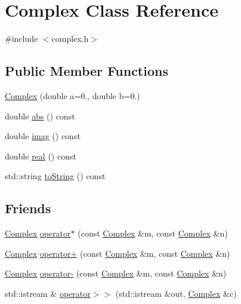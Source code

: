 \hypertarget{classComplex}{}\section{Complex Class Reference}
\label{classComplex}


{\ttfamily \#include $<$complex.\+h$>$}

\subsection*{Public Member Functions}
\begin{DoxyCompactItemize}
\item 
\mbox{\hyperlink{classComplex_a900a80f2ea5c0c3dc9393402b6ce8df3}{Complex}} (double a=0., double b=0.)
\item 
double \mbox{\hyperlink{classComplex_ad534b137e1216937005dd363a5579ed0}{abs}} () const
\item 
double \mbox{\hyperlink{classComplex_ac6d0f1ec6a24b5904bc3a206b3c117ff}{imag}} () const
\item 
double \mbox{\hyperlink{classComplex_a3a3f678878dde3a729f94dfefbdc4ef2}{real}} () const
\item 
std\+::string \mbox{\hyperlink{classComplex_a1fe5121d6528fdea3f243321b3fa3a49}{to\+String}} () const
\end{DoxyCompactItemize}
\subsection*{Friends}
\begin{DoxyCompactItemize}
\item 
\mbox{\hyperlink{classComplex}{Complex}} \mbox{\hyperlink{classComplex_afcef21e5f4570416aa39a3412fb107c4}{operator$\ast$}} (const \mbox{\hyperlink{classComplex}{Complex}} \&m, const \mbox{\hyperlink{classComplex}{Complex}} \&n)
\item 
\mbox{\hyperlink{classComplex}{Complex}} \mbox{\hyperlink{classComplex_a47f36e8ddc742de052086d653d7b8e04}{operator+}} (const \mbox{\hyperlink{classComplex}{Complex}} \&m, const \mbox{\hyperlink{classComplex}{Complex}} \&n)
\item 
\mbox{\hyperlink{classComplex}{Complex}} \mbox{\hyperlink{classComplex_ab2328f9c33b801e1ab56ee119493440f}{operator-\/}} (const \mbox{\hyperlink{classComplex}{Complex}} \&m, const \mbox{\hyperlink{classComplex}{Complex}} \&n)
\item 
std\+::istream \& \mbox{\hyperlink{classComplex_a4c3792c8f6bd0778d0607c3a161e9eb6}{operator$>$$>$}} (std\+::istream \&out, \mbox{\hyperlink{classComplex}{Complex}} \&c)
\end{DoxyCompactItemize}


